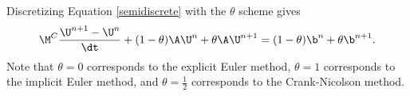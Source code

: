 Discretizing Equation \eqref{semidiscrete} with the $\theta$ scheme gives
\begin{equation}\label{galerkin_theta}
  \M^C\frac{\U^{n+1}-\U^n}{\dt}
  + (1-\theta)\A\U^n + \theta\A\U^{n+1}
  = (1-\theta)\b^n + \theta\b^{n+1}.
\end{equation}
Note that $\theta=0$ corresponds to the explicit Euler method,
$\theta=1$ corresponds to the implicit Euler method, and $\theta=\frac{1}{2}$
corresponds to the Crank-Nicolson method.

